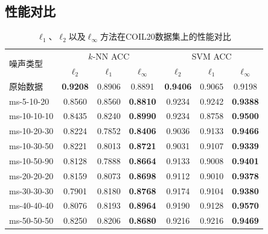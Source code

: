 \subsection{性能对比}

\begin{table}[!t]
        \caption{\mbox{$\ell_{1}$、$\ell_{2}$以及$\ell_{\infty}$方法在COIL20数据集上的性能对比}}
        \label{tab:coil}
        \centering
            \begin{tabular}{lcccccc}
    \hline
    \multirow{2}{*}{噪声类型} & \multicolumn{3}{c}{$k$-NN ACC}                                                                         & \multicolumn{3}{c}{SVM ACC}                                                                            \\ \cline{2-7}
                           & $\ell_2$                         & $\ell_1$                         & $\ell_\infty$                    & $\ell_2$                         & $\ell_1$                         & $\ell_\infty$                    \\ \hline
    原始数据               & \textbf{0.9208} & 0.8906                           & {0.8891}       & \textbf{0.9406} & 0.9065                           & 0.9198                           \\
    ms-5-10-20                  & 0.8560                           & 0.8560                           & \textbf{0.8810} & 0.9234                           & 0.9242                           & \textbf{0.9388} \\
    ms-10-10-10 & 0.8435 & 0.8240 & \textbf{0.8990} & 0.9234 & 0.8758 & \textbf{0.9500} \\
    ms-10-20-30 & 0.8224 & 0.7852 & \textbf{0.8406} & 0.9036 & 0.9133 & \textbf{0.9466} \\
    ms-10-30-50 & 0.8221 & 0.8013 & \textbf{0.8721} & 0.9031 & 0.9107 & \textbf{0.9339} \\
    ms-10-50-90 & 0.8128 & 0.7888 & \textbf{0.8664} & 0.9133 & 0.9008 & \textbf{0.9401} \\
    ms-20-20-20 & 0.8159 & 0.8073 & \textbf{0.8698} & 0.9112 & 0.9010 & \textbf{0.9378} \\
    ms-30-30-30 & 0.7901 & 0.8180 & \textbf{0.8768} & 0.9174 & 0.9104 & \textbf{0.9380} \\
    ms-40-40-40 & 0.8076 & 0.8193 & \textbf{0.8964} & 0.9190 & 0.9128 & \textbf{0.9570} \\
    ms-50-50-50 & 0.8250 & 0.8206 & \textbf{0.8680} & 0.9216 & 0.9216 & \textbf{0.9469} \\

\end{tabular}
\end{table}
